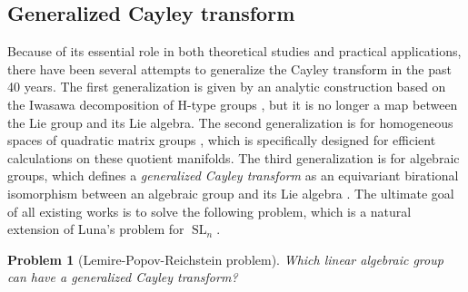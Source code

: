 \documentclass[11pt,reqno]{amsart}
\DeclareMathOperator{\SL}{SL}
\newtheorem{problem}[theorem]{Problem}
\begin{document}
\subsection*{Generalized Cayley transform}
Because of its essential role in both theoretical studies and practical applications,  there have been several attempts to generalize the Cayley transform in the past 40 years.  The first generalization is given by an analytic construction based on the Iwasawa decomposition of H-type groups \cite{Helgason78,CDK91,CDKR98,ACD04,AD06},  but it is no longer a map between the Lie group and its Lie algebra.  The second generalization is for homogeneous spaces of quadratic matrix groups \cite{GMP11,GSAS21},  which is specifically designed for efficient calculations on these quotient manifolds.  The third generalization is for algebraic groups,  which defines a \emph{generalized Cayley transform} as an equivariant birational isomorphism between an algebraic group and its Lie algebra \cite{BR85,KM03}.  The ultimate goal of all existing works \cite{KM03,LPR06,BKLR14,BK15,Borovoi15} is to solve the following problem,  which is a natural extension of Luna's problem \cite{Domingo75} for $\SL_n$.
\begin{problem}[Lemire-Popov-Reichstein problem]\cite[Problem~1.7]{LPR06}\label{prob:LPR}
Which linear algebraic group can have a generalized Cayley transform?
\end{problem}
\end{document}
